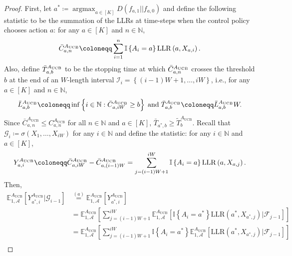 \documentclass[letterpaper, 10 pt, conference]{ieeeconf}  %
\newcommand{\lp}{\left(}
\newcommand{\rp}{\right)}
\newcommand{\lb}{\left[}
\newcommand{\rb}{\right]}
\newcommand{\lbp}{\left\{}
\newcommand{\rbp}{\right\}}
\newcommand{\mcal}{\mathcal}
\newcommand{\mrm}{\mathrm}
\newcommand{\mbb}{\mathbb}
\newcommand{\E}{\mathbb{E}}
\newcommand{\argmax}{\mathop{\mathrm{argmax}}}
\begin{document}
\begin{proof}
First, let $a^{*} \coloneqq \argmax_{a \in \lb K \rb} D\lp f_{a,1} || f_{a,0} \rp$ and define the following statistic to be the summation of the LLRs at time-steps when the control policy chooses action $a$: for any $a \in \lb K \rb$ and $n \in \mbb{N}$,
%
\begin{align}\label{eq:Sum_LLR_sep}
    \Bar{C}_{a,n}^{A_{\mrm{UCB}}}\coloneqq \sum_{i=1}^{n} \mbb{I} \lbp A_{i} = a \rbp \mrm{LLR}\lp a, X_{a, i} \rp.
\end{align}
%
Also, define $\Bar{T}_{a,b}^{A_{\mrm{UCB}}}$ to be the stopping time at which $\Bar{C}_{a,n}^{A_{\mrm{UCB}}}$ crosses the threshold $b$ at the end of an $W$-length interval $\mcal{I}_{i} = \lbp (i-1)W + 1, \dots, iW \rbp$, i.e., for any $a \in \lb K \rb$ and $n \in \mbb{N}$,
%
\begin{align}\label{eq:Sum_LLR_stop_sep}
    \bar{L}_{a,b}^{A_{\mrm{UCB}}} \coloneqq \inf \lbp i \in \mbb{N}: \Bar{C}_{a, iW}^{A_{\mrm{UCB}}} \geq b \rbp \mrm{\; and \;} \Bar{T}_{a,b}^{A_{\mrm{UCB}}} \coloneqq \bar{L}_{a,b}^{A_{\mrm{UCB}}}W.
\end{align}
%
Since $\bar{C}_{a,n}^{A_{\mrm{UCB}}} \leq C_{a,n}^{A_{\mrm{UCB}}}$ for all $n \in \mbb{N}$ and $a \in \lb K \rb$, $\bar{T}_{a^{*},b} \geq \tilde{T}_{b}^{A_{\mrm{UCB}}}$. Recall that $\mcal{G}_{i} \coloneqq \sigma \lp X_{1}, \dots, X_{iW} \rp$ for any $i \in \mbb{N}$ and define the statistic: for any $i \in \mbb{N}$ and $a \in \lb K \rb$,
%
\begin{equation}
    Y_{a,i}^{A_{\mrm{UCB}}} \coloneqq \Bar{C}_{a,iW}^{A_{\mrm{UCB}}} - \Bar{C}_{a,\lp i - 1 \rp W}^{A_{\mrm{UCB}}} = \sum_{j=(i-1)W + 1}^{iW} \mbb{I} \lbp A_{i} = a \rbp \mrm{LLR}\lp a, X_{a, j}\rp.
\end{equation}
%
Then,
%
\begin{align}
    \E_{1,\mcal{A}}^{A_{\mrm{UCB}}} \lb Y_{a^{*},i}^{A_{\mrm{UCB}}} \Big| \mcal{G}_{i-1} \rb &\overset{(a)}{=} \E_{1,\mcal{A}}^{A_{\mrm{UCB}}} \lb Y_{a^{*},i}^{A_{\mrm{UCB}}} \rb \nonumber\\
    &= \E_{1,\mcal{A}}^{A_{\mrm{UCB}}} \lb \sum_{j=(i-1)W + 1}^{iW} \E_{1,\mcal{A}}^{A_{\mrm{UCB}}} \lb \mbb{I} \lbp A_{i} = a^{*} \rbp \mrm{LLR}\lp a^{*}, X_{a^{*}, j}\rp | \mcal{F}_{j-1} \rb \rb \nonumber\\
    &= \E_{1,\mcal{A}}^{A_{\mrm{UCB}}} \lb \sum_{j=(i-1)W + 1}^{iW} \mbb{I} \lbp A_{i} = a^{*} \rbp \E_{1,\mcal{A}}^{A_{\mrm{UCB}}} \lb \mrm{LLR}\lp a^{*}, X_{a^{*}, j}\rp | \mcal{F}_{j-1} \rb \rb \nonumber\\

\end{align}
\end{proof}
\end{document}
